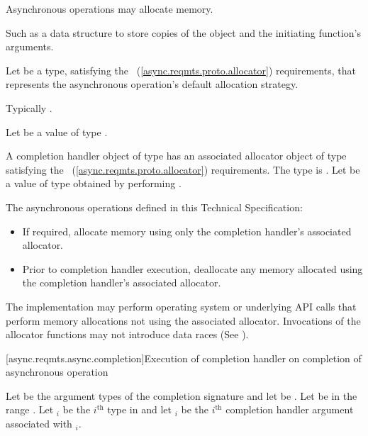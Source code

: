 \pnum
Asynchronous operations may allocate memory. \begin{note} Such as a data structure to store copies of the  object and the initiating function's arguments. \end{note}

\pnum
Let  be a type, satisfying the ~(\ref{async.reqmts.proto.allocator}) requirements, that represents the asynchronous operation's default allocation strategy. \begin{note} Typically . \end{note} Let  be a value of type .

\pnum
A completion handler object of type  has an associated allocator object  of type  satisfying the ~(\ref{async.reqmts.proto.allocator}) requirements. The type  is . Let  be a value of type  obtained by performing .

\pnum
 The asynchronous operations defined in this Technical Specification:

\begin{itemize}
\item
If required, allocate memory using only the completion handler's associated allocator.

\item
Prior to completion handler execution, deallocate any memory allocated using the completion handler's associated allocator.
\end{itemize}

\pnum
 \begin{note} The implementation may perform operating system or underlying API calls that perform memory allocations not using the associated allocator. Invocations of the allocator functions may not introduce data races (See ). \end{note}



[async.reqmts.async.completion]{Execution of completion handler on completion of asynchronous operation}

\pnum
Let  be the argument types of the completion signature  and let  be . Let  be in the range . Let $_i$ be the $i^\text{th}$ type in  and let $_i$ be the $i^\text{th}$ completion handler argument associated with $_i$.

